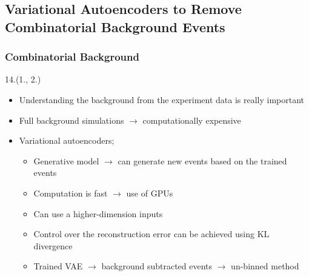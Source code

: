 \documentclass[12pt, xcolor={dvipsnames}, aspectratio = 169, sans,mathserif]{beamer}
\newenvironment{List}[2]
{\begin{textblock}{#1}#2
\begin{itemize}}
{\end{itemize}
\end{textblock}}
\begin{document}
\subsection{Variational Autoencoders to Remove Combinatorial Background Events}

\begin{frame}
\frametitle{Combinatorial Background}

\begin{List}{14.}{(1., 2.)}

  \item Understanding the background from the experiment data is really important

  \item Full background simulations $\rightarrow$ computationally expensive

  \item Variational autoencoders;

  \begin{itemize}

    \item Generative model $\rightarrow$ can generate new events based on the trained events

    \item Computation is fast $\rightarrow$ use of GPUs

    \item Can use a higher-dimension inputs

    \item Control over the reconstruction error can be achieved using KL divergence

    \item Trained VAE $\rightarrow$ background subtracted events $\rightarrow$ un-binned method

  \end{itemize}

\end{List}

\end{frame}
\end{document}
